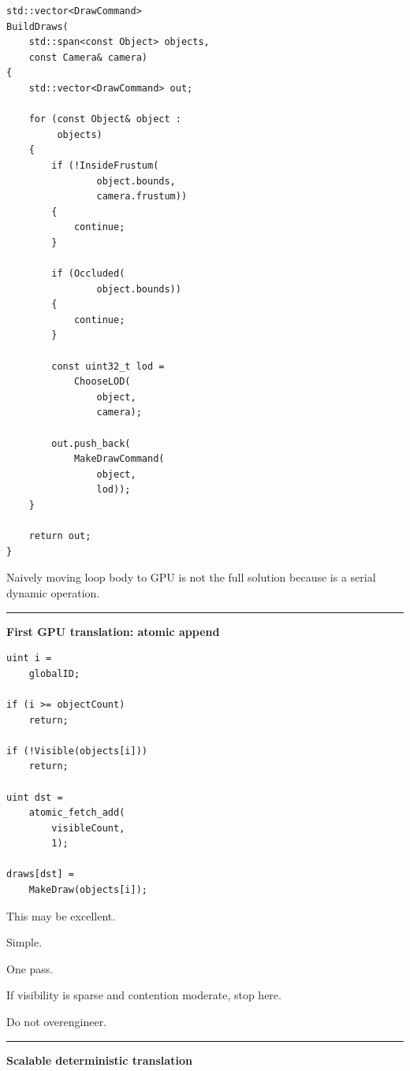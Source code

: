 \protect{}\label{p10-serial-cull}%
\begin{verbatim}
std::vector<DrawCommand>
BuildDraws(
    std::span<const Object> objects,
    const Camera& camera)
{
    std::vector<DrawCommand> out;

    for (const Object& object :
         objects)
    {
        if (!InsideFrustum(
                object.bounds,
                camera.frustum))
        {
            continue;
        }

        if (Occluded(
                object.bounds))
        {
            continue;
        }

        const uint32_t lod =
            ChooseLOD(
                object,
                camera);

        out.push_back(
            MakeDrawCommand(
                object,
                lod));
    }

    return out;
}
\end{verbatim}

Naively moving loop body to GPU is not the full solution because  is a serial dynamic operation.

\begin{center}\rule{0.5\linewidth}{0.5pt}\end{center}

\textbf{First GPU translation: atomic append}

\protect{}\label{p10-atomic-cull}%
\begin{verbatim}
uint i =
    globalID;

if (i >= objectCount)
    return;

if (!Visible(objects[i]))
    return;

uint dst =
    atomic_fetch_add(
        visibleCount,
        1);

draws[dst] =
    MakeDraw(objects[i]);
\end{verbatim}

This may be excellent.

Simple.

One pass.

If visibility is sparse and contention moderate, stop here.

Do not overengineer.

\begin{center}\rule{0.5\linewidth}{0.5pt}\end{center}

\textbf{Scalable deterministic translation}

